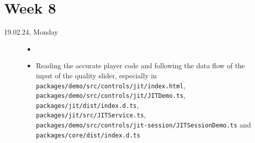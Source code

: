 \documentclass[a4, 11pt]{scrartcl}
\begin{document}
\newpage
\section*{Week 8}	





\begin{description}
	
	
	
\item[19.02.24, Monday]
\begin{itemize}
	\item[]
	\item Reading the accurate player code and following the data flow of the input of the quality slider, especially in \\ \texttt{packages/demo/src/controls/jit/index.html}, \\ \texttt{packages/demo/src/controls/jit/JITDemo.ts}, \\ \texttt{packages/jit/dist/index.d.ts}, \\ \texttt{packages/jit/src/JITService.ts}, \\ \texttt{packages/demo/src/controls/jit-session/JITSessionDemo.ts} and \\ \texttt{packages/core/dist/index.d.ts}
	
\end{itemize}
	
	
	
	
	

\end{description}
\end{document}
